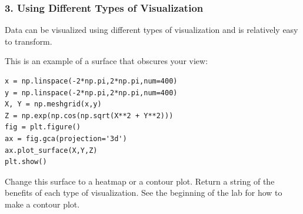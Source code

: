 \subsubsection*{3. Using Different Types of Visualization}

Data can be visualized using different types of visualization and is relatively easy to transform.

\begin{problem}
This is an example of a surface that obscures your view:
\begin{lstlisting}
x = np.linspace(-2*np.pi,2*np.pi,num=400)
y = np.linspace(-2*np.pi,2*np.pi,num=400)
X, Y = np.meshgrid(x,y)
Z = np.exp(np.cos(np.sqrt(X**2 + Y**2)))
fig = plt.figure()
ax = fig.gca(projection='3d')
ax.plot_surface(X,Y,Z)
plt.show()
\end{lstlisting}
Change this surface to a heatmap or a contour plot.  Return a string of the benefits of each type of visualization.  See the beginning of the lab for how to make a contour plot.
\label{prob:differentVisualizations}
\end{problem}

